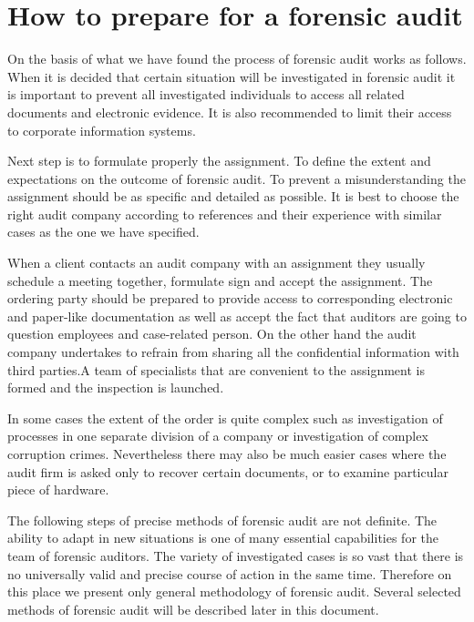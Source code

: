 




\section{How to prepare for a forensic audit}

On the basis of what we have found the process of forensic audit works as follows. When it is decided that certain situation will be investigated in forensic audit it is important to prevent all investigated individuals to access all related documents and electronic evidence. It is also recommended to limit their access to corporate information systems. 

Next step is to formulate properly the assignment. To define the extent and expectations on the outcome of forensic audit. To prevent a misunderstanding the assignment should be as specific and detailed as possible. It is best to choose the right audit company according to references and their experience with similar cases as the one we have specified.

When a client contacts an audit company with an assignment they usually schedule a meeting together, formulate sign and accept the assignment. The ordering party should be prepared to provide access to corresponding electronic and paper-like documentation as well as accept the fact that auditors are going to question employees and case-related person. On the other hand the audit company undertakes to refrain from sharing all the confidential information with third parties.A team of specialists that are convenient to the assignment is formed and the inspection is launched. 

In some cases the extent of the order is quite complex such as investigation of processes in one separate division of a company or investigation of complex corruption crimes. Nevertheless there may also be much easier cases where the audit firm is asked only to recover certain documents, or to examine particular piece of hardware. 

The following steps of precise methods of forensic audit are not definite. The ability to adapt in new situations is one of many essential capabilities for the team of forensic auditors. The variety of investigated cases is so vast that there is no universally valid and precise course of action in the same time. Therefore on this place we present only general methodology of forensic audit. Several selected methods of forensic audit will be described later in this document. 


